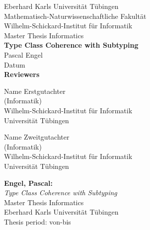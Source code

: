 \documentclass[twoside,12pt,a4paper]{report}
\begin{document}
 
\begin{titlepage}
 \begin{center}
  {\LARGE Eberhard Karls Universit\"at T\"ubingen}\\
  {\large Mathematisch-Naturwissenschaftliche Fakult\"at \\
Wilhelm-Schickard-Institut f\"ur Informatik\\[4cm]}
  {\huge Master Thesis Informatics\\[2cm]}
  {\Large\bf  Type Class Coherence with Subtyping\\[1.5cm]}
 {\large Pascal Engel}\\[0.5cm]
Datum\\[4cm]
{\small\bf Reviewers}\\[0.5cm]
  \parbox{7cm}{\begin{center}{\large Name Erstgutachter}\\
   (Informatik)\\
  {\footnotesize Wilhelm-Schickard-Institut f\"ur Informatik\\
	Universit\"at T\"ubingen}\end{center}}\hfill\parbox{7cm}{\begin{center}
  {\large Name Zweitgutachter}\\
  (Informatik)\\
  {\footnotesize Wilhelm-Schickard-Institut f\"ur Informatik\\
	Universit\"at T\"ubingen}\end{center}
 }
  \end{center}
\end{titlepage}


\thispagestyle{empty}
\vspace*{\fill}
\begin{minipage}{11.2cm}
\textbf{Engel, Pascal:}\\
\emph{Type Class Coherence with Subtyping}\\ Master Thesis Informatics\\
Eberhard Karls Universit\"at T\"ubingen\\
Thesis period: von-bis
\end{minipage}
\newpage
\end{document}
